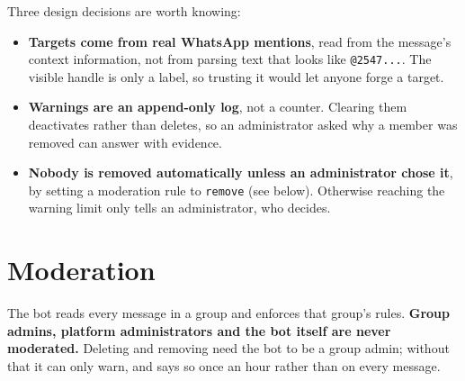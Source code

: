 \documentclass[11pt,a4paper]{report}
\begin{document}
Three design decisions are worth knowing:

\begin{itemize}
  \item \textbf{Targets come from real WhatsApp mentions}, read from the
        message's context information, not from parsing text that looks like
        \texttt{@2547...}. The visible handle is only a label, so trusting it
        would let anyone forge a target.
  \item \textbf{Warnings are an append-only log}, not a counter. Clearing them
        deactivates rather than deletes, so an administrator asked why a member
        was removed can answer with evidence.
  \item \textbf{Nobody is removed automatically unless an administrator
        chose it}, by setting a moderation rule to \texttt{remove} (see
        below). Otherwise reaching the warning limit only tells an
        administrator, who decides.
\end{itemize}

\section{Moderation}

The bot reads every message in a group and enforces that group's rules.
\textbf{Group admins, platform administrators and the bot itself are never
moderated.} Deleting and removing need the bot to be a group admin; without
that it can only warn, and says so once an hour rather than on every message.
\end{document}
